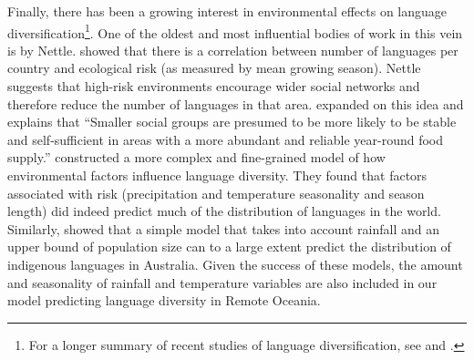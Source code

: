 \documentclass[unnumsec,webpdf,modern,medium]{oup-authoring-template}
\begin{document}

Finally, there has been a growing interest in environmental effects on language diversification\footnote{For a longer summary of recent studies of language diversification, see \citet{gavin2013toward} and \citet{greenhill2015demographic}.}. One of the oldest and most influential bodies of work in this vein is by Nettle. \citet{NETTLE1998} showed that there is a correlation between number of languages per country and ecological risk (as measured by mean growing season). Nettle suggests that high-risk environments encourage wider social networks and therefore reduce the number of languages in that area. \citet{hua2019ecological} expanded on this idea and explains that ``Smaller social groups are presumed to be more likely to be stable and self-sufficient in areas with a more abundant and reliable year-round food supply.'' \citet{hua2019ecological} constructed a more complex and fine-grained model of how environmental factors influence language diversity. They found that factors associated with risk (precipitation and temperature seasonality and season length) did indeed predict much of the distribution of languages in the world. Similarly, \citet{gavin2017process} showed that a simple model that takes into account rainfall and an upper bound of population size can to a large extent predict the distribution of indigenous languages in Australia. Given the success of these models, the amount and seasonality of rainfall and temperature variables are also included in our model predicting language diversity in Remote Oceania. 


\end{document}
